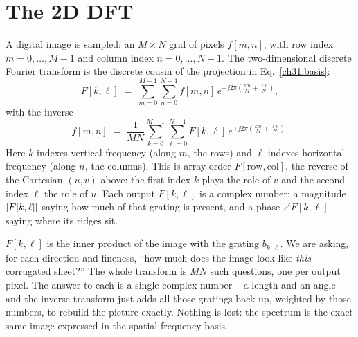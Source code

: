 \section{The 2D DFT}
\label{ch31:2d-dft}
A digital image is sampled: an $M\times N$ grid of pixels $f[m,n]$, with row index
$m=0,\dots,M-1$ and column index $n=0,\dots,N-1$. The two-dimensional discrete
Fourier transform is the discrete cousin of the projection in
Eq.~\eqref{ch31:basis}:
\begin{equation}
F[k,\ell] \;=\; \sum_{m=0}^{M-1}\sum_{n=0}^{N-1}
f[m,n]\, e^{-\jj 2\pi\left(\frac{k m}{M} + \frac{\ell n}{N}\right)},
\label{ch31:dft2d}
\end{equation}
with the inverse
\begin{equation}
f[m,n] \;=\; \frac{1}{MN}\sum_{k=0}^{M-1}\sum_{\ell=0}^{N-1}
F[k,\ell]\, e^{+\jj 2\pi\left(\frac{k m}{M} + \frac{\ell n}{N}\right)}.
\label{ch31:idft2d}
\end{equation}
Here $k$ indexes vertical frequency (along $m$, the rows) and $\ell$ indexes
horizontal frequency (along $n$, the columns). This is array order
$F[\text{row},\text{col}]$, the reverse of the Cartesian $(u,v)$ above: the
first index $k$ plays the role of $v$ and the second index $\ell$ the role of $u$. Each output $F[k,\ell]$ is a complex
number: a magnitude $\lvert F[k,\ell]\rvert$ saying how much of that grating is present,
and a phase $\angle F[k,\ell]$ saying where its ridges sit.
\begin{happeningbox}
$F[k,\ell]$ is the inner product of the image with the grating $b_{k,\ell}$. We are
asking, for each direction and fineness, ``how much does the image look like
\emph{this} corrugated sheet?'' The whole transform is $MN$ such questions, one per
output pixel. The answer to each is a single complex number -- a length and an
angle -- and the inverse transform just adds all those gratings back up, weighted by
those numbers, to rebuild the picture exactly. Nothing is lost: the spectrum is
the exact same image expressed in the spatial-frequency basis.
\end{happeningbox}
